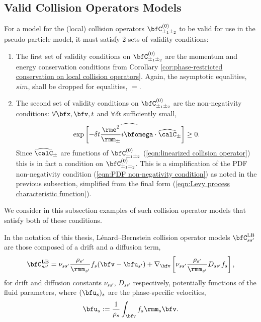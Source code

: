 \subsection*{Valid Collision Operators Models}
    For a model for the (local) collision operators $\bfC_{\pm_{1}\pm_{2}}^{(0)}$ to be valid for use in the pseudo-particle model, it must satisfy 2 sets of validity conditions:
    \begin{enumerate}
        \item  The first set of validity conditions on $\bfC_{\pm_{1}\pm_{2}}^{(0)}$ are the momentum and energy conservation conditions from Corollary \ref{cor:phase-restricted conservation on local collision operators}. Again, the asymptotic equalities, $sim$, shall be dropped for equalities, $=$.

        \item  The second set of validity conditions on $\bfC_{\pm_{1}\pm_{2}}^{(0)}$ are the non-negativity conditions: $\forall \bfx, \bfv, t$ and $\forall \delta t$ sufficiently small,
        \begin{equation}\label{eqn:linearized collision operator non-negativity}
            \widehat{\exp\left[- \delta t\frac{\rme^{2}}{\rmm_{\pm}}i\bfomega\cdot\widehat{\calC}_{\pm}\right]}  \geq  0.
        \end{equation}
        Since $\widehat{\calC}_{\pm}$ are functions of $\bfC_{\pm_{1}\pm_{2}}^{(0)}$ (\ref{eqn:linearized collision operator}) this is in fact a condition on $\bfC_{\pm_{1}\pm_{2}}^{(0)}$. This is a simplification of the PDF non-negativity condition (\ref{eqn:PDF non-negativity condition}) as noted in the previous subsection, simplified from the final form (\ref{eqn:Levy process characteristic function}).
    \end{enumerate}
    
    We consider in this subsection examples of such collision operator models that satisfy both of these conditions.

    \line

    \begin{definition}
        In the notation of this thesis, Lénard--Bernstein collision operator models $\bfC_{ss'}^{\rm LB}$ are those composed of a drift and a diffusion term,
        \begin{equation}\label{eqn:Lénard--Bernstein operator}
            \bfC_{ss'}^{\rm LB}  =  \nu_{ss'}\frac{\rho_{s'}}{\rmm_{s'}}f_{s}(\bfv - \bfu_{s'}) + \nabla_{\bfv}\left[\nu_{ss'}\frac{\rho_{s'}}{\rmm_{s'}}D_{ss'}f_{s}\right],
        \end{equation}
        for drift and diffusion constants $\nu_{ss'}$, $D_{ss'}$ respectively, potentially functions of the fluid parameters, where $(\bfu_{s})_{s}$ are the phase-specific velocities,
        \begin{equation}
            \bfu_{s}  :=  \frac{1}{\rho_{s}}\int_{\bfv}f_{s}\rmm_{s}\bfv.
        \end{equation}
    \end{definition}

